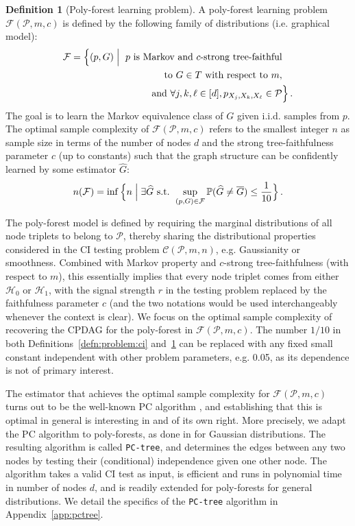 \documentclass{article}
\theoremstyle{definition}
\newtheorem{definition}{Definition}
\theoremstyle{definition}
\theoremstyle{definition}
\theoremstyle{definition}
\theoremstyle{definition}
\theoremstyle{definition}
\theoremstyle{remark}
\theoremstyle{remark}
\newcommand{\prob}{\mathbb{P}}
\newcommand{\AND}{\text{ and }}
\newcommand{\mec}{\overline{G}}
\newcommand{\pltr}{\mathcal{T}}
\newcommand{\dpdm}{m}
\newcommand{\dd}{d}
\newcommand{\pfclass}{\mathcal{F}}
\newcommand{\hone}{\mathcal{H}_1}
\newcommand{\hzero}{\mathcal{H}_0}
\begin{document}
\begin{definition}[Poly-forest learning problem]\label{defn:problem:plfr}
    A poly-forest learning problem $\pfclass(\mathcal{P},\dpdm,c)$ is defined by the following family of distributions (i.e. graphical model):
    \begin{align*}
        \pfclass=\Big\{(p,G)\Bigm\vert\,\, p \text{ is Markov and }c\text{-strong tree-faithful}&\\
        \qquad\qquad \text{ to }G\in\mathcal \pltr \text{ with respect to }\dpdm, &\\
        \AND \forall j,k,\ell\in [d], p_{X_j,X_k,X_\ell}\in \mathcal{P}& \Big\}\,.
    \end{align*}
    The goal is to learn the Markov equivalence class of $G$ given i.i.d. samples from $p$.
    The optimal sample complexity of $\pfclass(\mathcal{P},\dpdm,c)$ refers to the smallest integer $n$ as sample size in terms of the number of nodes $\dd$ and the strong tree-faithfulness parameter $c$ (up to constants) such that the graph structure can be confidently learned by some estimator $\widehat{G}$:
    \begin{align*}
        n(\pfclass) = \inf\Big\{n \Bigm\vert \exists \widehat{G} \text{ s.t. }\sup_{(p,G)\in\pfclass} \prob(\widehat{G}\ne \mec) \le \frac{1}{10}\Big\}\,.
    \end{align*}
\end{definition}
The poly-forest model is defined by requiring the marginal distributions of all node triplets to belong to $\mathcal{P}$, thereby sharing the distributional properties considered in the CI testing problem $\mathcal{C}(\mathcal{P},\dpdm,n)$, e.g. Gaussianity or smoothness. 
Combined with Markov property and $c$-strong tree-faithfulness (with respect to $\dpdm$), this essentially implies that every node triplet comes from either $\hzero$ or $\hone$, with the signal strength $r$ in the testing problem replaced by the faithfulness parameter $c$ (and the two notations would be used interchangeably whenever the context is clear).
We focus on the optimal sample complexity of recovering the CPDAG for the poly-forest in $\pfclass(\mathcal{P},\dpdm,c)$.
The number $1/10$ in both Definitions~\ref{defn:problem:ci} and~\ref{defn:problem:plfr} can be replaced with any fixed small constant independent with other problem parameters, e.g. 0.05, as its dependence is not of primary interest.


The estimator that achieves the optimal sample complexity for $\pfclass(\mathcal{P},\dpdm,c)$ turns out to be the well-known PC algorithm \citep{spirtes1991algorithm}, and establishing that this is optimal in general is interesting in and of its own right. More precisely, we adapt the PC algorithm to poly-forests, as done in \citet{wang2024optimal} for Gaussian distributions. The resulting algorithm is called \texttt{PC-tree}, and determines the edges between any two nodes by testing their (conditional) independence given one other node.
The algorithm takes a valid CI test as input, is efficient and runs in polynomial time in number of nodes $\dd$, and is readily extended for poly-forests for general distributions.
We detail the specifics of the \texttt{PC-tree} algorithm in Appendix~\ref{app:pctree}.
\end{document}
